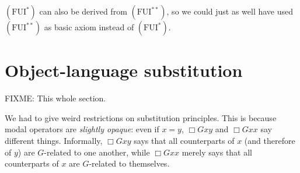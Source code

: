 \documentclass[11pt]{woarticle}
\newcommand{\cmnt}[1]{\iffalse #1 \fi}
\theoremstyle{break}
\theoremstyle{nonumberplain}
\newcommand{\1}{\;\,|\;\,}
\newcommand{\T}[1]{\ensuremath{(\mathrm{ #1})}}
\begin{document}
\T{FUI^{*}} can also be derived from \T{FUI^{**}}, so we could just as well have
used \T{FUI^{**}} as basic axiom instead of \T{FUI^*}.

\cmnt{
  \begin{proof}    
    \begin{alignat*}{2}
      1.\quad & \vdash_L x\!=\!y \then A \then [y/x]A 
      &\quad& \text{ (LL, given $y$ is m.f. in $A$)}.\\
      2.\quad & \vdash_L \neg[y/x]A \then x\!=\!y \then \neg A 
      && \text{ (1, PC)}.\\
      3.\quad & \vdash_L \forall x(\neg[y/x]A \then x\!=\!y \then \neg A)
      && \text{ (2, UG)}.\\
      4.\quad & \vdash_L \forall x(\neg[y/x]A) \then \forall x(x\!=\!y \then \neg A)
      && \text{ (3, UD)}.\\
      5.\quad & \vdash_L \neg[y/x]A \then \forall x(\neg[y/x]A)
      && \text{ (VQ)}.\\
      6.\quad & \vdash_L \neg[y/x]A \then \forall x(x\!=\!y \then \neg A)
      && \text{ (4, 5, PC)}.\\
      7.\quad & \vdash_L \exists x(x\!=\!y \land A) \then [y/x]A
      && \text{ (6, PC)}.\\
      8.\quad & \vdash_L \forall x A \then Ey \then \exists x(y\!=\!x \land A)
      && \text{ (FUI*)}.\\
      9.\quad & \vdash_L \forall x A \then Ey \then [y/x] A && \text{(7,8)}.
    \end{alignat*}
    \qed
  \end{proof}  
}



\section{Object-language substitution}\label{sec:substitution-logics}

FIXME: This whole section.

We had to give weird restrictions on substitution principles. This is because
modal operators are \emph{slightly opaque}: even if $x=y$, $\Box Gxy$ and
$\Box Gxx$ say different things. Informally, $\Box Gxy$ says that all
counterparts of $x$ (and therefore of $y$) are $G$-related to one another, while
$\Box Gxx$ merely says that all counterparts of $x$ are $G$-related to
themselves.
\end{document}
